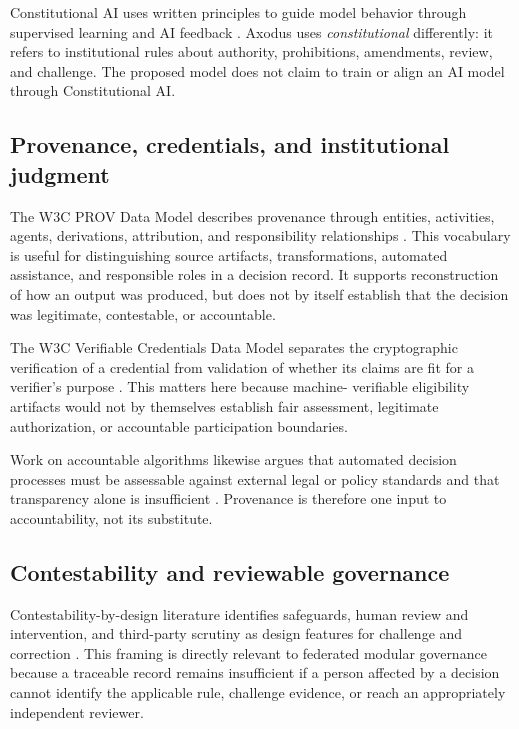 \documentclass[11pt]{article}
\begin{document}
Constitutional AI uses written principles to guide model behavior through
supervised learning and AI feedback \citep{bai2022constitutional}. Axodus uses
\emph{constitutional} differently: it refers to institutional rules about
authority, prohibitions, amendments, review, and challenge. The proposed model
does not claim to train or align an AI model through Constitutional AI.

\subsection{Provenance, credentials, and institutional judgment}

The W3C PROV Data Model describes provenance through entities, activities,
agents, derivations, attribution, and responsibility relationships
\citep{w3c2013provdm}. This vocabulary is useful for distinguishing source
artifacts, transformations, automated assistance, and responsible roles in a
decision record. It supports reconstruction of how an output was produced,
but does not by itself establish that the decision was legitimate,
contestable, or accountable.

The W3C Verifiable Credentials Data Model separates the cryptographic
verification of a credential from validation of whether its claims are fit for
a verifier's purpose \citep{w3c2025vcdm}. This matters here because machine-
verifiable eligibility artifacts would not by themselves establish fair
assessment, legitimate authorization, or accountable participation
boundaries.

Work on accountable algorithms likewise argues that automated decision
processes must be assessable against external legal or policy standards and
that transparency alone is insufficient \citep{kroll2017accountable}.
Provenance is therefore one input to accountability, not its substitute.

\subsection{Contestability and reviewable governance}

Contestability-by-design literature identifies safeguards, human review and
intervention, and third-party scrutiny as design features for challenge and
correction \citep{alfrink2023contestable}. This framing is directly relevant
to federated modular governance because a traceable record remains
insufficient if a person affected by a decision cannot identify the
applicable rule, challenge evidence, or reach an appropriately independent
reviewer.
\end{document}
